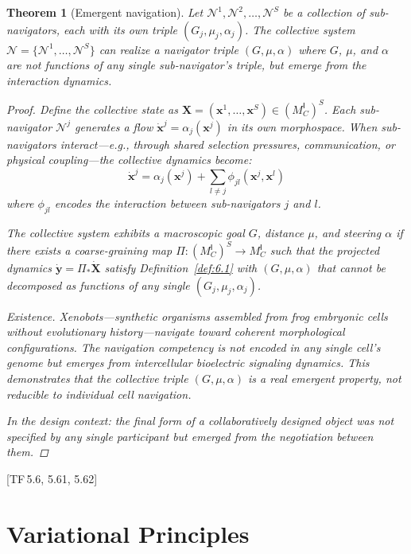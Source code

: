 \documentclass[10pt]{article}
\theoremstyle{definition}
\theoremstyle{plain}
\newtheorem{theorem}[definition]{Theorem}
\theoremstyle{remark}
\newcommand{\MC}{M^{\mathsf{I}}_C}          %
\newcommand{\Nav}{\mathcal{N}}               %
\newcommand{\TF}[1]{\textnormal{[TF\,#1]}}  %
\begin{document}
\begin{theorem}[Emergent navigation]\label{thm:8.1}
Let $\Nav^1, \Nav^2, \ldots, \Nav^S$ be a collection of sub-navigators,
each with its own triple $(G_j, \mu_j, \alpha_j)$. The collective system
$\Nav = \{\Nav^1, \ldots, \Nav^S\}$ can realize a navigator triple
$(G, \mu, \alpha)$ where $G$, $\mu$, and $\alpha$ are \emph{not}
functions of any single sub-navigator's triple, but emerge from the
interaction dynamics.

\begin{proof}
Define the collective state as $\bm{X} = (\bm{x}^1, \ldots, \bm{x}^S)
\in {(\MC)}^S$. Each sub-navigator $\Nav^j$ generates a flow
$\dot{\bm{x}}^j = \alpha_j(\bm{x}^j)$ in its own morphospace.
When sub-navigators interact---e.g., through shared selection pressures,
communication, or physical coupling---the collective dynamics become:
\[
  \dot{\bm{x}}^j = \alpha_j(\bm{x}^j)
  + \sum_{l \neq j} \phi_{jl}(\bm{x}^j, \bm{x}^l)
\]
where $\phi_{jl}$ encodes the interaction between sub-navigators $j$
and $l$.

The collective system exhibits a macroscopic goal $G$, distance $\mu$,
and steering $\alpha$ if there exists a coarse-graining map
$\Pi : {(\MC)}^S \to \MC$ such that the projected dynamics
$\dot{\bm{y}} = \Pi_* \dot{\bm{X}}$ satisfy Definition~\ref{def:6.1}
with $(G, \mu, \alpha)$ that cannot be decomposed as functions of any
single $(G_j, \mu_j, \alpha_j)$.

\textit{Existence.}\;
Xenobots---synthetic organisms assembled from frog embryonic cells
without evolutionary history---navigate toward coherent morphological
configurations. The navigation competency is not encoded in any single
cell's genome but emerges from intercellular bioelectric signaling
dynamics. This
demonstrates that the collective triple $(G, \mu, \alpha)$ is a real
emergent property, not reducible to individual cell navigation.

In the design context: the final form of a collaboratively designed
object was not specified by any single participant but emerged from the
negotiation between them. \qedhere
\end{proof}
\end{theorem}

\TF{5.6, 5.61, 5.62}


\newpage
\section{Variational Principles}\label{sec:variational}
\end{document}

